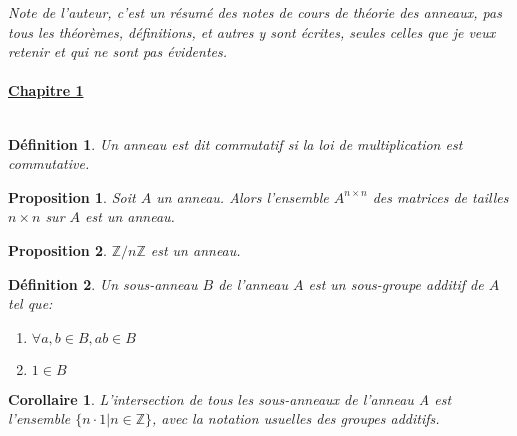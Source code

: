 \documentclass[12pt,a4paper]{article}
\begin{document}

\newcommand{\znz}{\mathbb{Z} / n \mathbb{Z} }
\newcommand{\zmz}{\mathbb{Z} / m \mathbb{Z} }
\newcommand{\zpz}{\mathbb{Z} / p \mathbb{Z} }
\newcommand{\dbs}{\\~\\}
\newcommand{\zdex}{\mathbb{Z} [x]}
\newcommand{\zdei}{\mathbb{Z} [i]}
\newcommand{\Mod}[1]{\ (\mathrm{mod}\ #1)}
\newtheorem{mydef}{Définition}
\newtheorem{thm}{Théorème}
\newtheorem{prop}{Proposition}
\newtheorem{cor}{Corollaire}
\newtheorem{lem}{Lemme}
\newtheorem{rap}{Rappel}
\newtheorem{rem}{Remarque}


\begin{flushleft}

\textit{Note de l'auteur, c'est un résumé des notes de cours de théorie des anneaux, pas tous les théorèmes, définitions, et autres y sont écrites, seules celles que je veux retenir et qui ne sont pas évidentes.}\dbs

\textbf{\underline{Chapitre 1}}\\~\\

\begin{mydef}
Un anneau est dit commutatif si la loi de multiplication est commutative.
\end{mydef}

\begin{prop} Soit $A$ un anneau. Alors l'ensemble $A^{n \times n}$ des matrices de tailles $n \times n$ sur $A$ est un anneau.\end{prop} 

\begin{prop} $\znz$ est un anneau.
\end{prop}

\begin{mydef} Un sous-anneau $B$ de l'anneau $A$ est un sous-groupe additif de $A$ tel que:
\begin{enumerate}
\item $ \forall a,b \in B, ab \in B $
\item $ 1 \in B$
\end{enumerate} 
\end{mydef}

\begin{cor} 
L'intersection de tous les sous-anneaux de l'anneau A est l'ensemble $ \{ n \cdot 1 | n \in \mathbb{Z} \} $, avec la notation usuelles des groupes additifs.
\end{cor}


\end{flushleft}
\end{document}
